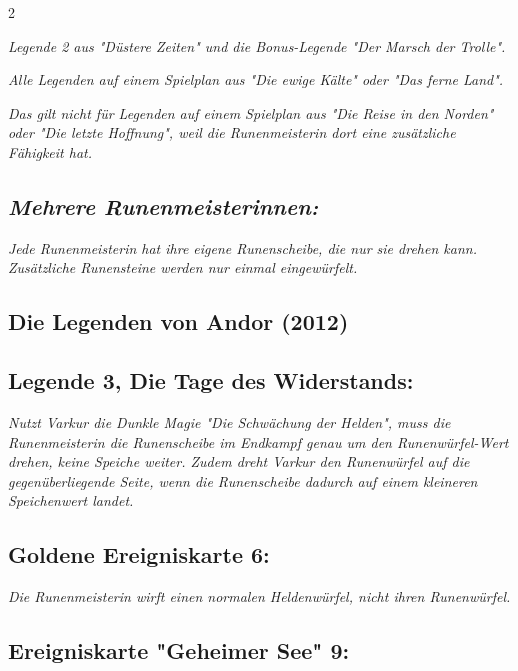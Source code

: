 \documentclass[10pt, a4paper, oneside]{book}
\newcommand{\fan}[1]{\textit{#1}}
\begin{document}
\begin{multicols*}{2}
\begin{nobgcolor}
\bullet{} \fan{Legende 2 aus "Düstere Zeiten" und die Bonus-Legende "Der Marsch der Trolle".}

\bullet{} \fan{Alle Legenden auf einem Spielplan aus "Die ewige Kälte" oder "Das ferne Land".}

\fan{Das gilt nicht für Legenden auf einem Spielplan aus "Die Reise in den Norden" oder "Die letzte Hoffnung", weil die Runenmeisterin dort eine zusätzliche Fähigkeit hat.}




\subsection{\fan{Mehrere Runenmeisterinnen:}}

\fan{Jede Runenmeisterin hat ihre eigene Runenscheibe, die nur sie drehen kann. Zusätzliche Runensteine werden nur einmal eingewürfelt.}


\end{nobgcolor}


\begin{bgcolor}
\section{Die Legenden von Andor (2012)}



\subsection{Legende 3, Die Tage des Widerstands:}

\fan{Nutzt Varkur die Dunkle Magie "Die Schwächung der Helden", muss die Runenmeisterin die Runenscheibe im Endkampf genau um den Runenwürfel-Wert drehen, keine Speiche weiter. Zudem dreht Varkur den Runenwürfel auf die gegenüberliegende Seite, wenn die Runenscheibe dadurch auf einem kleineren Speichenwert landet.}




\subsection{Goldene Ereigniskarte 6:}

\fan{Die Runenmeisterin wirft einen normalen Heldenwürfel, nicht ihren Runenwürfel.}


\subsection{Ereigniskarte "Geheimer See" 9:}


\end{bgcolor}
\end{multicols*}
\end{document}
